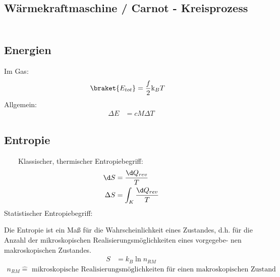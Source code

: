 \documentclass[11pt,letterpaper]{article}
\begin{document}
\subsection{Wärmekraftmaschine / Carnot - Kreisprozess}
{
    \begin{align*}
    \end{align*}
}

\subsection{Energien}
{
    Im Gas:
    \begin{align*}
        \braket{E_{tot}} &= \frac{f}{2}\mathrm{k}_B T
    \end{align*}
    Allgemein:
    \begin{align*}
        \Delta  E &= c M\Delta T
    \end{align*}

}

\subsection{Entropie}{
    \ \ \ \ Klassischer, thermischer Entropiebegriff:
    \begin{align*}
        \d S &= \frac{\d Q_{rev}}{T} \\
        \Delta S &= \int_K \frac{\d Q_{rev}}{T} 
    \end{align*}
    Statistischer Entropiebegriff:

    Die Entropie ist ein Maß für die Wahrscheinlichkeit eines Zustandes, d.h. für
    die Anzahl der mikroskopischen Realisierungsmöglichkeiten eines vorgegebe-
    nen makroskopischen Zustandes.
    \begin{align*}
        S &= k_B \ln n_{RM}
    \end{align*}
    \begin{align*}
        n_{RM} \hat{=} \text{ mikroskopische Realisierungsmöglichkeiten für einen makroskopischen Zustand}
    \end{align*}
}
\end{document}
